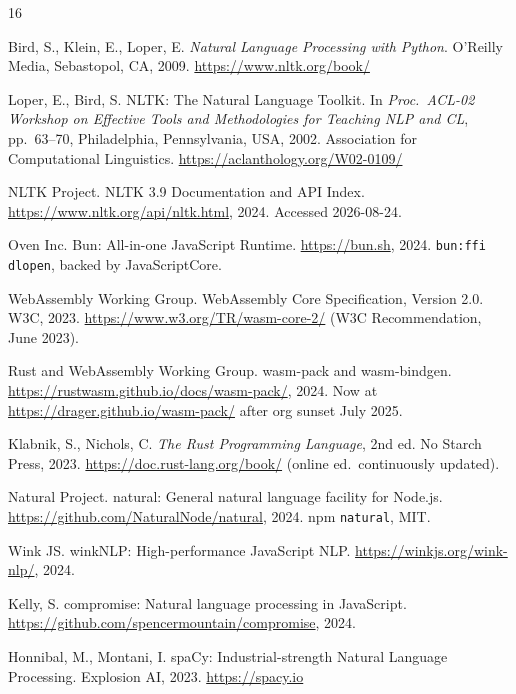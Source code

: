 \documentclass[smallextended]{svjour3}
\begin{document}
\begin{thebibliography}{16}

Bird, S., Klein, E., Loper, E.
\textit{Natural Language Processing with Python}.
O'Reilly Media, Sebastopol, CA, 2009.
\url{https://www.nltk.org/book/}

Loper, E., Bird, S.
{N}LTK: The Natural Language Toolkit.
In \textit{Proc.\ ACL-02 Workshop on Effective Tools and Methodologies for Teaching NLP and CL}, pp.\ 63--70, Philadelphia, Pennsylvania, USA, 2002. Association for Computational Linguistics.
\url{https://aclanthology.org/W02-0109/}

NLTK Project.
NLTK 3.9 Documentation and API Index.
\url{https://www.nltk.org/api/nltk.html}, 2024. Accessed 2026-08-24.

Oven Inc.
Bun: All-in-one JavaScript Runtime.
\url{https://bun.sh}, 2024. \texttt{bun:ffi} \texttt{dlopen}, backed by JavaScriptCore.

WebAssembly Working Group.
WebAssembly Core Specification, Version 2.0.
W3C, 2023. \url{https://www.w3.org/TR/wasm-core-2/} (W3C Recommendation, June 2023).

Rust and WebAssembly Working Group.
wasm-pack and wasm-bindgen.
\url{https://rustwasm.github.io/docs/wasm-pack/}, 2024. Now at \url{https://drager.github.io/wasm-pack/} after org sunset July 2025.

Klabnik, S., Nichols, C.
\textit{The Rust Programming Language}, 2nd ed.
No Starch Press, 2023. \url{https://doc.rust-lang.org/book/} (online ed.\ continuously updated).

Natural Project.
natural: General natural language facility for Node.js.
\url{https://github.com/NaturalNode/natural}, 2024. npm \texttt{natural}, MIT.

Wink JS.
winkNLP: High-performance JavaScript NLP.
\url{https://winkjs.org/wink-nlp/}, 2024.

Kelly, S.
compromise: Natural language processing in JavaScript.
\url{https://github.com/spencermountain/compromise}, 2024.

Honnibal, M., Montani, I.
spaCy: Industrial-strength Natural Language Processing.
Explosion AI, 2023. \url{https://spacy.io}


\end{thebibliography}
\end{document}
